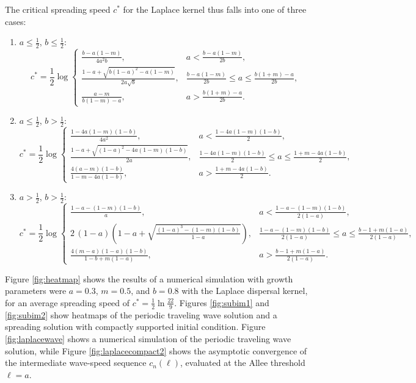 \documentclass[11pt]{article}
\theoremstyle{definition}
\numberwithin{equation}{section}
\numberwithin{thm}{section}
\renewcommand{\a}{a}
\renewcommand{\b}{b}
\newcommand{\m}{m}
\begin{document}
The critical spreading speed $c^*$ for the Laplace kernel thus falls into one of three cases:
\begin{enumerate}[{Case} 1.]

\item $\a\leq\frac{1}{2}$, $\b\leq\frac{1}{2}$:
$$ c^* = \frac{1}{2}\log \begin{cases}
\frac{\b-\a(1-\m)}{4\a^2\b}, & \a < \frac{\b-\a(1-\m)}{2\b}, \\
\frac{1-\a + \sqrt{\b(1-\a)^2 - \a(1-\m)}}{2\a\sqrt\b}, & \frac{\b-\a(1-\m)}{2\b} \leq \a \leq \frac{\b(1+\m)-\a}{2\b}, \\
\frac{\a-\m}{\b(1-\m)-\a}, & \a > \frac{\b(1+\m)-\a}{2\b}.
\end{cases} $$

\item $\a\leq\frac{1}{2}$, $\b>\frac{1}{2}$:
$$ c^* = \frac12 \log \begin{cases}
\frac{1-4\a(1-\m)(1-\b)}{4\a^2}, & a<\frac{1-4\a(1-\m)(1-\b)}{2}, \\
\frac{1-\a + \sqrt{(1-\a)^2 - 4\a(1-\m)(1-\b)}}{2\a}, & \frac{1-4\a(1-\m)(1-\b)}{2}\leq\a\leq\frac{1+\m-4\a(1-\b)}{2}, \\
\frac{4(\a-\m)(1-\b)}{1-\m-4\a(1-\b)}, & \a>\frac{1+\m-4\a(1-\b)}{2}.
\end{cases} $$

\item $\a>\frac{1}{2}$, $\b>\frac{1}{2}$:
$$ c^* = \frac12 \log \begin{cases}
\frac{1-\a-(1-\m)(1-\b)}{\a}, & \a<\frac{1-\a-(1-\m)(1-\b)}{2(1-\a)}, \\
2\,(1-\a)\left(1-\a + \sqrt{\frac{(1-\a)^3-(1-\m)(1-\b) }{1-\a}}\right), & \frac{1-\a-(1-\m)(1-\b)}{2(1-\a)}\leq\a\leq\frac{\b-1+\m(1-\a)}{2(1-\a)}, \\
\frac{4(\m-\a)(1-\a)(1-\b)}{1-\b+\m(1-\a)}, & \a>\frac{\b-1+\m(1-\a)}{2(1-\a)}.
\end{cases} $$
\end{enumerate}

Figure \ref{fig:heatmap} shows the results of a numerical simulation with growth parameters were $a=0.3$, $m=0.5$, and $b=0.8$ with the Laplace dispersal kernel, for an average spreading speed of $c^* = \frac{1}{2} \ln \frac{22}{9}$.
Figures \ref{fig:subim1} and \ref{fig:subim2} show heatmaps of the periodic traveling wave solution and a spreading solution with compactly supported initial condition.
Figure \ref{fig:laplacewave} shows a numerical simulation of the periodic traveling wave solution, while Figure \ref{fig:laplacecompact2} shows the asymptotic convergence of the intermediate wave-speed sequence $c_n(\ell)$, evaluated at the Allee threshold $\ell = \a$.
\end{document}
